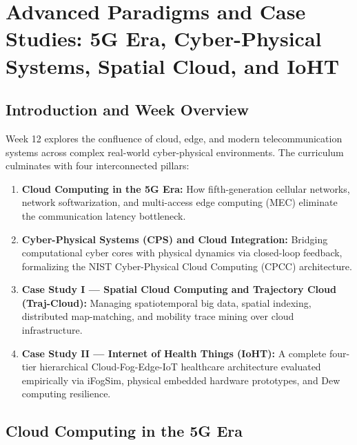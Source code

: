 \chapter{Advanced Paradigms and Case Studies: 5G Era, Cyber-Physical Systems, Spatial Cloud, and IoHT}

\section{Introduction and Week Overview}
Week 12 explores the confluence of cloud, edge, and modern telecommunication systems across complex real-world cyber-physical environments. The curriculum culminates with four interconnected pillars:
\begin{enumerate}[leftmargin=*]
  \item \textbf{Cloud Computing in the 5G Era:} How fifth-generation cellular networks, network softwarization, and multi-access edge computing (MEC) eliminate the communication latency bottleneck.
  \item \textbf{Cyber-Physical Systems (CPS) and Cloud Integration:} Bridging computational cyber cores with physical dynamics via closed-loop feedback, formalizing the NIST Cyber-Physical Cloud Computing (CPCC) architecture.
  \item \textbf{Case Study I --- Spatial Cloud Computing and Trajectory Cloud (Traj-Cloud):} Managing spatiotemporal big data, spatial indexing, distributed map-matching, and mobility trace mining over cloud infrastructure.
  \item \textbf{Case Study II --- Internet of Health Things (IoHT):} A complete four-tier hierarchical Cloud-Fog-Edge-IoT healthcare architecture evaluated empirically via iFogSim, physical embedded hardware prototypes, and Dew computing resilience.
\end{enumerate}

\section{Cloud Computing in the 5G Era}
